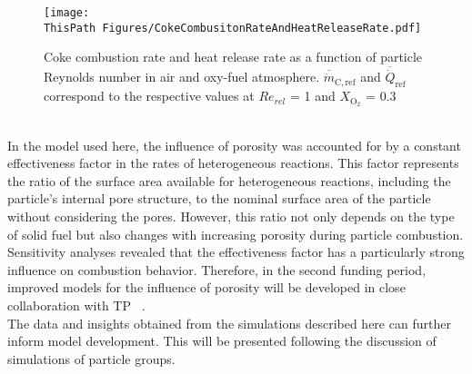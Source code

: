 \begin{btUnit}
\begin{figure}
	\texttt{[image: \\ThisPath Figures/CokeCombusitonRateAndHeatReleaseRate.pdf]}
	\caption{Coke combustion rate and heat release rate as a function of particle Reynolds number in air and oxy-fuel atmosphere. $\overline{\dot{m}}_\mathrm{C,ref}$ and $\overline{\dot{Q}}_\mathrm{ref}$ correspond to the respective values at $Re_{rel}$ = 1 and $X_\mathrm{O_2}$ = 0.3}\label{fig:B3RFCokeComb}
\end{figure}
\\
In the model used here, the influence of porosity was accounted for by a constant effectiveness factor in the rates of heterogeneous reactions. This factor represents the ratio of the surface area available for heterogeneous reactions, including the particle's internal pore structure, to the nominal surface area of the particle without considering the pores. However, this ratio not only depends on the type of solid fuel but also changes with increasing porosity during particle combustion. Sensitivity analyses revealed that the effectiveness factor has a particularly strong influence on combustion behavior. Therefore, in the second funding period, improved models for the influence of porosity will be developed in close collaboration with TP ~.
\\
The data and insights obtained from the simulations described here can further inform model development. This will be presented following the discussion of simulations of particle groups.


\end{btUnit}
